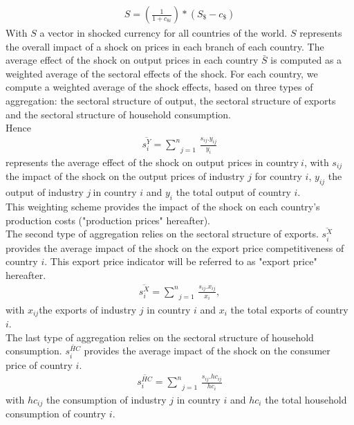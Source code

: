 \documentclass[11pt,a4paper]{article}
\begin{document}
\begin{eqnarray*}
	S=\left( \frac{1}{1+{{c}_{\$i}}}\right)*\left({{S}_{\$}}-{{c}_{\$}}\right)
\end{eqnarray*}
With $S$ a vector in shocked currency for all countries of the world. $S$ represents the overall impact of a shock on prices in each branch of each country. The average effect of the shock on output prices in each country $\bar{S}$ is computed as a weighted average of the sectoral effects of the shock. For each country, we compute a weighted average of the shock effects, based on three types of aggregation: the sectoral structure of output, the sectoral structure of exports and the sectoral structure of household consumption.\\
Hence 
\begin{eqnarray*}
\overline{s_{i}^{Y}}=\underset{j=1}{\overset{n}{\mathop \sum }}\,\frac{{{s}_{ij}}.{{y}_{ij}}}{{{y}_{i}}}
 \end{eqnarray*}
represents the average effect of the shock on output prices in country$~i$, with ${{{s}}_{{ij}}}$ the impact of the shock on the output prices of industry $j$ for country $i$, ${{{y}}_{{ij}}}$ the output of industry $j~$in country $i$ and ${{{y}}_{{i}}}$ the total output of country $i$. \\
This weighting scheme provides the impact of the shock on each country's production costs ("production prices" hereafter).\\
The second type of aggregation relies on the sectoral structure of exports. $\overline{s_{i}^{X}}$ provides the average impact of the shock on the export price competitiveness of country $i$. This export price indicator will be referred to as "export price" hereafter. \\
 \begin{eqnarray*}
\overline{s_{i}^{X}}=\underset{j=1}{\overset{n}{\mathop \sum }}\,\frac{{{s}_{ij}}.{{x}_{ij}}}{{{x}_{i}}},
 \end{eqnarray*} 
with $x_{ij}$the exports of industry $j$ in country $i$ and $x_{i}$ the total exports of country $i$. \\
The last type of aggregation relies on the sectoral structure of household consumption. $\overline{s_{i}^{HC}}$ provides the average impact of the shock on the consumer price of country $i$. 
 \begin{eqnarray*}
\overline{s_{i}^{HC}}=\underset{j=1}{\overset{n}{\mathop \sum }}\,\frac{{{s}_{ij}}.h{{c}_{ij}}}{h{{c}_{i}}}
 \end{eqnarray*} 
with $hc_{ij}$ the consumption of industry $j$ in country $i$ and ${h}{{{c}}_{{i}}}$ the total household consumption of country $i$. 
\end{document}
